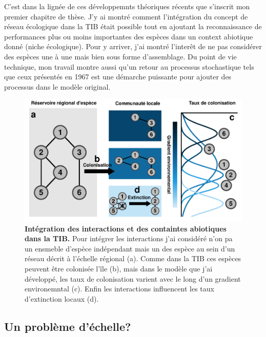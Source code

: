C'est dans la lignée de ces développemnts théoriques récents que
s'inscrit mon premier chapitre de thèse. J'y ai montré comment
l'intégration du concept de réseau écologique dans la TIB était possible
tout en ajoutant la reconnaissance de performances plus ou moins
importantes des espèces dans un context abiotique donné (niche
écologique). Pour y arriver, j'ai montré l'interêt de ne pas considérer
des espèces une à une mais bien sous forme d'assemblage. Du point de vie
technique, mon travail montre aussi qu'un retour au processus
stochastique tels que ceux présentés en 1967 est une démarche puissante
pour ajouter des processus dans le modèle original.

\begin{figure}[htbp]
\centering
\includegraphics{fig/fig2.pdf}
\caption{\textbf{Intégration des interactions et des containtes
abiotiques dans la TIB.} Pour intégrer les interactions j'ai considéré
n'on pa un ensmeble d'espèce indépendant mais un des espèce au sein d'un
réseau décrit à l'échelle régional (a). Comme dans la TIB ces espèces
peuvent être colonisée l'île (b), mais dans le modèle que j'ai
développé, les taux de colonisation varient avec le long d'un gradient
environemntal (c). Enfin les interactions influencent les taux
d'extinction locaux (d).\label{fig:figGTIB}}
\end{figure}

\subsection*{Un problème d'échelle?}\label{un-probluxe8me-duxe9chelle}

